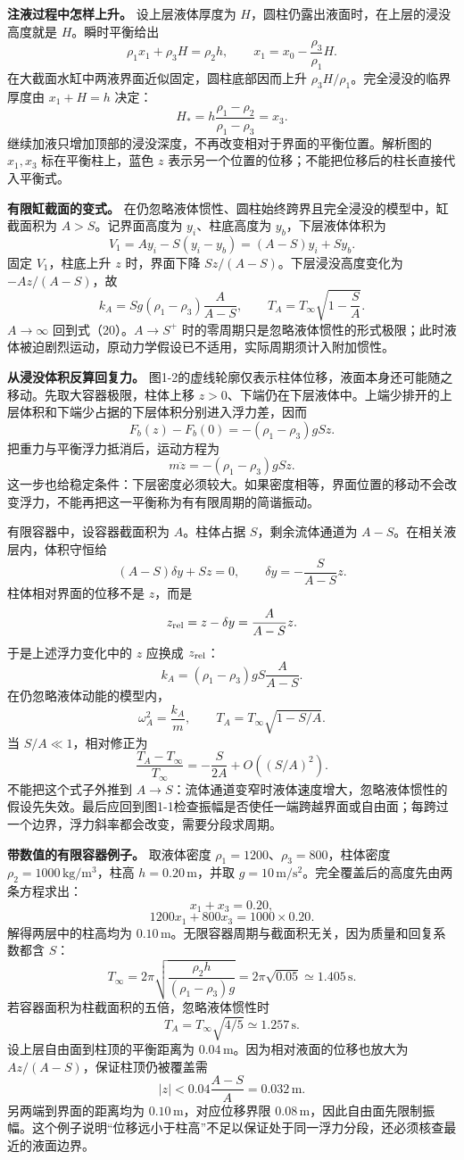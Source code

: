 \documentclass[12pt,a4paper,UTF8]{ctexart}
\begin{document}
\textbf{注液过程中怎样上升。} 设上层液体厚度为
\(H\)，圆柱仍露出液面时，在上层的浸没高度就是 \(H\)。瞬时平衡给出 \[
\rho_1x_1+\rho_3H=\rho_2h,
\qquad x_1=x_0-\frac{\rho_3}{\rho_1}H.
\] 在大截面水缸中两液界面近似固定，圆柱底部因而上升
\(\rho_3H/\rho_1\)。完全浸没的临界厚度由 \(x_1+H=h\) 决定： \[
H_* =h\frac{\rho_1-\rho_2}{\rho_1-\rho_3}=x_3.
\] 继续加液只增加顶部的浸没深度，不再改变相对于界面的平衡位置。解析图的
\(x_1,x_3\) 标在平衡柱上，蓝色 \(z\)
表示另一个位置的位移；不能把位移后的柱长直接代入平衡式。

\textbf{有限缸截面的变式。}
在仍忽略液体惯性、圆柱始终跨界且完全浸没的模型中，缸截面积为
\(A>S\)。记界面高度为 \(y_i\)、柱底高度为 \(y_b\)，下层液体体积为 \[
V_1=Ay_i-S(y_i-y_b)=(A-S)y_i+Sy_b.
\] 固定 \(V_1\)，柱底上升 \(z\) 时，界面下降
\(Sz/(A-S)\)。下层浸没高度变化为 \(-Az/(A-S)\)，故 \[
k_A=Sg(\rho_1-\rho_3)\frac{A}{A-S},
\qquad T_A=T_\infty\sqrt{1-\frac SA}.
\] \(A\to\infty\) 回到式（20）。\(A\to S^+\)
时的零周期只是忽略液体惯性的形式极限；此时液体被迫剧烈运动，原动力学假设已不适用，实际周期须计入附加惯性。

\textbf{从浸没体积反算回复力。}
图1-2的虚线轮廓仅表示柱体位移，液面本身还可能随之移动。先取大容器极限，柱体上移
\(z>0\)、下端仍在下层液体中。上端少排开的上层体积和下端少占据的下层体积分别进入浮力差，因而
\[
F_b(z)-F_b(0)=-(\rho_1-\rho_3)gSz.
\] 把重力与平衡浮力抵消后，运动方程为 \[
m\ddot z=-(\rho_1-\rho_3)gSz.
\]
这一步也给稳定条件：下层密度必须较大。如果密度相等，界面位置的移动不会改变浮力，不能再把这一平衡称为有有限周期的简谐振动。

有限容器中，设容器截面积为 \(A\)。柱体占据 \(S\)，剩余流体通道为
\(A-S\)。在相关液层内，体积守恒给 \[
(A-S)\delta y+Sz=0,
\qquad \delta y=-\frac{S}{A-S}z.
\] 柱体相对界面的位移不是 \(z\)，而是 \[
z_{\rm rel}=z-\delta y=\frac{A}{A-S}z.
\] 于是上述浮力变化中的 \(z\) 应换成 \(z_{\rm rel}\)： \[
k_A=(\rho_1-\rho_3)gS\frac{A}{A-S}.
\] 在仍忽略液体动能的模型内， \[
\omega_A^2=\frac{k_A}{m},\qquad
T_A=T_\infty\sqrt{1-S/A}.
\] 当 \(S/A\ll1\)，相对修正为 \[
\frac{T_A-T_\infty}{T_\infty}=-\frac{S}{2A}+O((S/A)^2).
\] 不能把这个式子外推到
\(A\to S\)：流体通道变窄时液体速度增大，忽略液体惯性的假设先失效。最后应回到图1-1检查振幅是否使任一端跨越界面或自由面；每跨过一个边界，浮力斜率都会改变，需要分段求周期。

\textbf{带数值的有限容器例子。} 取液体密度
\(\rho_1=1200\)、\(\rho_3=800\)，柱体密度
\(\rho_2=1000\,\mathrm{kg/m^3}\)，柱高 \(h=0.20\,\mathrm m\)，并取
\(g=10\,\mathrm{m/s^2}\)。完全覆盖后的高度先由两条方程求出： \[
x_1+x_3=0.20,
\] \[
1200x_1+800x_3=1000\times0.20.
\] 解得两层中的柱高均为
\(0.10\,\mathrm m\)。无限容器周期与截面积无关，因为质量和回复系数都含
\(S\)： \[
T_\infty=2\pi\sqrt{\frac{\rho_2h}{(\rho_1-\rho_3)g}}
=2\pi\sqrt{0.05}\simeq1.405\,\mathrm s.
\] 若容器面积为柱截面积的五倍，忽略液体惯性时 \[
T_A=T_\infty\sqrt{4/5}\simeq1.257\,\mathrm s.
\] 设上层自由面到柱顶的平衡距离为
\(0.04\,\mathrm m\)。因为相对液面的位移也放大为
\(Az/(A-S)\)，保证柱顶仍被覆盖需 \[
|z|<0.04\frac{A-S}{A}=0.032\,\mathrm m.
\] 另两端到界面的距离均为 \(0.10\,\mathrm m\)，对应位移界限
\(0.08\,\mathrm m\)，因此自由面先限制振幅。这个例子说明``位移远小于柱高''不足以保证处于同一浮力分段，还必须核查最近的液面边界。
\end{document}
